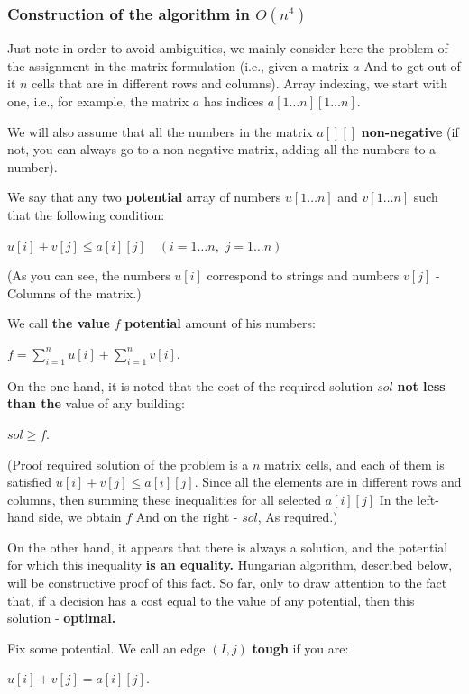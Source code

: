 \subsubsection{ Construction of the algorithm in $O (n ^ 4)$}

Just note in order to avoid ambiguities, we mainly consider here the problem of the assignment in the matrix formulation (i.e., given a matrix $a$ And to get out of it $n$ cells that are in different rows and columns). Array indexing, we start with one, i.e., for example, the matrix $a$ has indices $a [1 \ldots n][1 \ldots n]$.

We will also assume that all the numbers in the matrix $a [][]$ \textbf{non-negative} (if not, you can always go to a non-negative matrix, adding all the numbers to a number).

We say that any two \textbf{potential} array of numbers $u [1 \ldots n]$ and $v [1 \ldots n]$ such that the following condition:

$u[i]+v[j]\le a[i][j]\quad(i=1\ldots n,\,\, j=1\ldots n)$

(As you can see, the numbers $u [i]$ correspond to strings and numbers $v [j]$ - Columns of the matrix.)

We call \textbf{the value} \textbf{$f$} \textbf{potential} amount of his numbers:

$f = \sum_ {i = 1} ^ n u [i] + \sum_ {i = 1} ^ n v [i].$

On the one hand, it is noted that the cost of the required solution $sol$ \textbf{not less than the} value of any building:

$sol \ge f.$

(Proof required solution of the problem is a $n$ matrix cells, and each of them is satisfied $u [i] + v [j] \le a [i][j]$. Since all the elements are in different rows and columns, then summing these inequalities for all selected $a [i][j]$ In the left-hand side, we obtain $f$ And on the right - $sol$, As required.)

On the other hand, it appears that there is always a solution, and the potential for which this inequality \textbf{is an equality.} Hungarian algorithm, described below, will be constructive proof of this fact. So far, only to draw attention to the fact that, if a decision has a cost equal to the value of any potential, then this solution - \textbf{optimal.}

Fix some potential. We call an edge $(I, j)$ \textbf{tough} if you are:

$u [i] + v [j] = a [i][j].$

